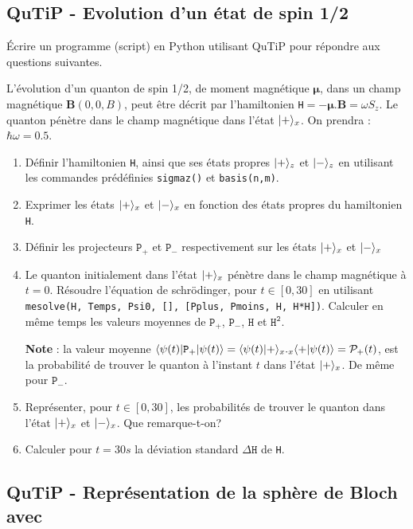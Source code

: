 \subsection{QuTiP - Evolution d'un état de spin 1/2}

Écrire un programme (script) en Python utilisant QuTiP pour répondre aux
questions suivantes.

L'évolution d'un quanton de spin 1/2, de moment magnétique $\mathbf{\mu}$, dans un champ magnétique $\textbf{B}(0,0,B)$, peut être décrit par l'hamiltonien \texttt{H}$=-\mathbf{\mu}.\textbf{B}=\omega S_z$. Le quanton pénètre dans le champ magnétique dans l'état $\vert+\rangle_x$. On prendra : $\hbar\omega=0.5$.
\begin{enumerate}
\item Définir l'hamiltonien \texttt{H}, ainsi que ses états propres $\vert+\rangle_z$ et $\vert-\rangle_z$ en utilisant les commandes prédéfinies \texttt{sigmaz()} et \texttt{basis(n,m)}.

\item Exprimer les états $\vert+\rangle_x$ et $\vert-\rangle_x$ en fonction des états propres du hamiltonien \texttt{H}.

\item Définir les projecteurs $\mathtt{P}_+$ et $\mathtt{P}_-$ respectivement sur les états $\vert+\rangle_x$ et $\vert-\rangle_x$

\item Le quanton initialement dans l'état $\vert+\rangle_x$ pénètre dans le champ 
magnétique à $t=0$. Résoudre l'équation de schr\"odinger, pour $t\in[0,30]$ en 
utilisant \texttt{mesolve(H, Temps, Psi0, [], [Pplus, Pmoins, H, H*H])}. 
Calculer en même temps les valeurs moyennes de $\mathtt{P}_+$, $\mathtt{P}_-$, 
$\mathtt{H}$ et $\mathtt{H^2}$.

\textbf{Note} : la valeur moyenne $\langle\psi(t)\vert\mathtt{P}_+\vert\psi(t)\rangle=\langle\psi(t)\vert+\rangle_x ._x\langle+\vert\psi(t)\rangle=\mathcal{P}_+(t)$, est la probabilité de trouver le quanton à l'instant $t$ dans l'état $\vert+\rangle_x$. De même pour $\mathtt{P}_-$.

\item Représenter, pour $t\in[0,30]$, les probabilités de trouver le quanton dans l'état $\vert+\rangle_x$ et $\vert-\rangle_x$. Que remarque-t-on?

\item Calculer pour $t=30s$ la déviation standard $\Delta \mathtt{H}$ de \texttt{H}.
\end{enumerate}

\subsection{QuTiP - Représentation de la sphère de Bloch avec }

